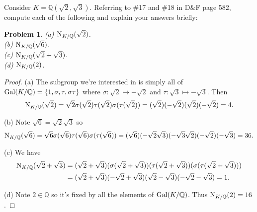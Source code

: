 \documentclass{article}
\newcommand{\gal}{\textup{Gal}}
\newcommand{\norm}{\textup{N}}
\newtheorem{problem}{Problem}
\begin{document}

Consider $K = \mathbb{Q}(\sqrt{2}, \sqrt{3})$. Referring to \#17 and \#18 in D\&F page 582, compute each of the following and explain your answers briefly:

\begin{problem}
(a) $\norm_{K/\mathbb{Q}} (\sqrt{2})$.\\
(b) $\norm_{K/\mathbb{Q}} (\sqrt{6})$.\\
(c) $\norm_{K/\mathbb{Q}} (\sqrt{2} + \sqrt{3})$.\\
(d) $\norm_{K/\mathbb{Q}} (2)$.
\end{problem}
\begin{proof}
(a) The subgroup we're interested in is simply all of $\gal(K/\mathbb{Q}) = \{1, \sigma, \tau, \sigma \tau\}$ where $\sigma : \sqrt{2} \mapsto -\sqrt{2}$ and $\tau : \sqrt{3} \mapsto -\sqrt{3}$. Then
\[
\norm_{K/\mathbb{Q}} (\sqrt{2}) = \sqrt{2} \sigma(\sqrt{2}) \tau(\sqrt{2}) \sigma(\tau(\sqrt{2})) = (\sqrt{2})(-\sqrt{2})(\sqrt{2})(-\sqrt{2}) = 4.
\]

(b) Note $\sqrt{6} = \sqrt{2} \sqrt{3}$ so
\[
\norm_{K/\mathbb{Q}} (\sqrt{6}) = \sqrt{6} \sigma(\sqrt{6}) \tau(\sqrt{6}) \sigma(\tau(\sqrt{6})) = (\sqrt{6}) (-\sqrt{2} \sqrt{3}) (-\sqrt{3} \sqrt{2}) (-\sqrt{2})(-\sqrt{3}) = 36.
\]

(c) We have
\begin{align*}
\norm_{K/\mathbb{Q}} (\sqrt{2} + \sqrt{3})
&= (\sqrt{2} + \sqrt{3}) (\sigma(\sqrt{2} + \sqrt{3})) (\tau(\sqrt{2} + \sqrt{3})) (\sigma(\tau(\sqrt{2} + \sqrt{3})))\\
&= (\sqrt{2} + \sqrt{3}) (-\sqrt{2} + \sqrt{3}) (\sqrt{2} - \sqrt{3}) (-\sqrt{2} - \sqrt{3}) = 1.
\end{align*}

(d) Note $2 \in \mathbb{Q}$ so it's fixed by all the elements of $\gal(K/\mathbb{Q})$. Thus $\norm_{K/\mathbb{Q}} (2) = 16$.
\end{proof}
\end{document}
